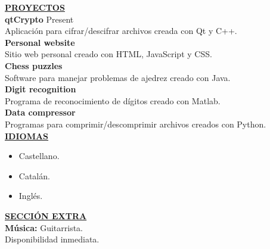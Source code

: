 \documentclass{article}
\begin{document}
		\noindent \textbf{\underline{PROYECTOS}} \\
	\noindent \textbf{qtCrypto}  \hfill  Present \\
	Aplicación para cifrar/descifrar archivos creada con Qt y C++. \\
	\noindent \textbf{Personal website}  \\
	Sitio web personal creado con HTML, JavaScript y CSS. \\
	\noindent \textbf{Chess puzzles}  \\
	Software para manejar problemas de ajedrez creado con Java. \\
	\noindent \textbf{Digit recognition}  \\
	Programa de reconocimiento de dígitos creado con Matlab. \\
	\noindent \textbf{Data compressor}  \\
	Programas para comprimir/descomprimir archivos creados con Python. \\
	
	
	\noindent \textbf{\underline{IDIOMAS}} \\
	\begin{itemize}[noitemsep,nolistsep,leftmargin=*]
		\item {Castellano.}
		\item {Catalán.}
		\item {Inglés. \\}
	\end{itemize}
	

	\noindent \textbf{\underline{SECCIÓN EXTRA}} \\
	\noindent \textbf{Música:} Guitarrista. \\
	\noindent Disponibilidad inmediata. 
	
	
\end{document}
